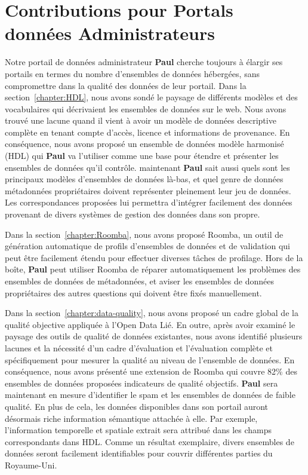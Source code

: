 \documentclass[a4paper,11pt,twoside]{ThesisStyle}
\begin{document}
\section{Contributions pour Portals données Administrateurs}

Notre portail de données administrateur \textbf{Paul} cherche toujours à élargir ses portails en termes du nombre d'ensembles de données hébergées, sans compromettre dans la qualité des données de leur portail. Dans la section~\ref{chapter:HDL}, nous avons sondé le paysage de différents modèles et des vocabulaires qui décrivaient les ensembles de données sur le web. Nous avons trouvé une lacune quand il vient à avoir un modèle de données descriptive complète en tenant compte d'accès, licence et informations de provenance. En conséquence, nous avons proposé un ensemble de données modèle harmonisé (HDL) qui \textbf{Paul} va l'utiliser comme une base pour étendre et présenter les ensembles de données qu'il contrôle. maintenant \textbf{Paul} sait aussi quels sont les principaux modèles d'ensembles de données là-bas, et quel genre de données métadonnées propriétaires doivent représenter pleinement leur jeu de données. Les correspondances proposées lui permettra d'intégrer facilement des données provenant de divers systèmes de gestion des données dans son propre.

Dans la section~\ref{chapter:Roomba}, nous avons proposé Roomba, un outil de génération automatique de profils d'ensembles de données et de validation qui peut être facilement étendu pour effectuer diverses tâches de profilage. Hors de la boîte, \textbf{Paul} peut utiliser Roomba de réparer automatiquement les problèmes des ensembles de données de métadonnées, et aviser les ensembles de données propriétaires des autres questions qui doivent être fixés manuellement.

Dans la section~\ref{chapter:data-quality}, nous avons proposé un cadre global de la qualité objective appliquée à l'Open Data Lié. En outre, après avoir examiné le paysage des outils de qualité de données existantes, nous avons identifié plusieurs lacunes et la nécessité d'un cadre d'évaluation et l'évaluation complète et spécifiquement pour mesurer la qualité au niveau de l'ensemble de données. En conséquence, nous avons présenté une extension de Roomba qui couvre 82\% des ensembles de données proposées indicateurs de qualité objectifs. \textbf{Paul} sera maintenant en mesure d'identifier le spam et les ensembles de données de faible qualité. En plus de cela, les données disponibles dans son portail auront désormais riche information sémantique attachée à elle. Par exemple, l'information temporelle et spatiale extrait sera attribué dans les champs correspondants dans HDL. Comme un résultat exemplaire, divers ensembles de données seront facilement identifiables pour couvrir différentes parties du Royaume-Uni.
\end{document}
